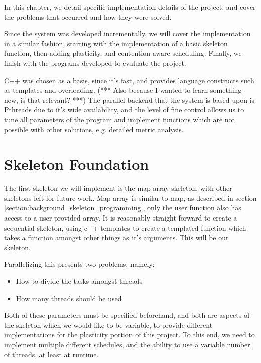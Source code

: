 
In this chapter, we detail specific implementation details of the project, and cover the problems that occurred and how they were solved.

Since the system was developed incrementally, we will cover the implementation in a similar fashion, starting with the implementation of a basic skeleton function, then adding plasticity, and contention aware scheduling. Finally, we finish with the programs developed to evaluate the project.

C++ was chosen as a basis, since it's fast, and provides language constructs such as templates and overloading. (*** Also because I wanted to learn something new, is that relevant? ***)
The parallel backend that the system is based upon is Pthreads due to it's wide availability, and the level of fine control allows us to tune all parameters of the program and implement functions which are not possible with other solutions, e.g. detailed metric analysis. 



\section{Skeleton Foundation}

The first skeleton we will implement is the map-array skeleton, with other skeletons left for future work. Map-array is similar to map, as described in section \ref{section:background_skeleton_programming}, only the user function also has access to a user provided array. It is reasonably straight forward to create a sequential skeleton, using c++ templates to create a templated function which takes a function amongst other things as it's arguments. This will be our skeleton. 

Parallelizing this presents two problems, namely:

\begin{itemize}
	\item How to divide the tasks amongst threads
	\item How many threads should be used
\end{itemize}
 
Both of these parameters must be specified beforehand, and both are aspects of the skeleton which we would like to be variable, to provide different implementations for the plasticity portion of this project. To this end, we need to implement multiple different schedules, and the ability to use a variable number of threads, at least at runtime.

